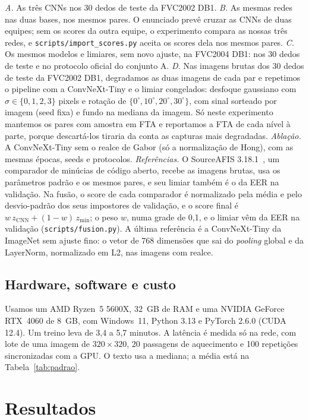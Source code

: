 \documentclass[conference]{IEEEtran}
\newcommand{\TrainMin}{de 3,4 a 5,7}
\begin{document}
\emph{A.} As três CNNs nos 30 dedos de teste da FVC2002 DB1. \emph{B.} As mesmas redes nas duas bases, nos mesmos pares. O enunciado prevê cruzar as CNNs de duas equipes; sem os scores da outra equipe, o experimento compara as nossas três redes, e \texttt{scripts/import\_scores.py} aceita os scores dela nos mesmos pares. \emph{C.} Os mesmos modelos e limiares, sem novo ajuste, na FVC2004 DB1: nos 30 dedos de teste e no protocolo oficial do conjunto A. \emph{D.} Nas imagens brutas dos 30 dedos de teste da FVC2002 DB1, degradamos as duas imagens de cada par e repetimos o pipeline com a ConvNeXt-Tiny e o limiar congelados: desfoque gaussiano com $\sigma\in\{0,1,2,3\}$ pixels e rotação de $\{0^\circ,10^\circ,20^\circ,30^\circ\}$, com sinal sorteado por imagem (seed fixa) e fundo na mediana da imagem. Só neste experimento mantemos os pares com amostra em FTA e reportamos a FTA de cada nível à parte, porque descartá-los tiraria da conta as capturas mais degradadas. \emph{Ablação.} A ConvNeXt-Tiny sem o realce de Gabor (só a normalização de Hong), com as mesmas épocas, seeds e protocolos. \emph{Referências.} O SourceAFIS 3.18.1~\cite{vazan2024sourceafis}, um comparador de minúcias de código aberto, recebe as imagens brutas, usa os parâmetros padrão e os mesmos pares, e seu limiar também é o da EER na validação. Na fusão, o score de cada comparador é normalizado pela média e pelo desvio-padrão dos seus impostores de validação, e o score final é $w\,z_{\text{CNN}}+(1-w)\,z_{\text{min}}$; o peso $w$, numa grade de 0,1, e o limiar vêm da EER na validação (\texttt{scripts/fusion.py}). A última referência é a ConvNeXt-Tiny da ImageNet sem ajuste fino: o vetor de 768 dimensões que sai do \emph{pooling} global e da LayerNorm, normalizado em L2, nas imagens com realce.

\subsection{Hardware, software e custo}

Usamos um AMD Ryzen~5 5600X, 32~GB de RAM e uma NVIDIA GeForce RTX~4060 de 8~GB, com Windows~11, Python 3.13 e PyTorch 2.6.0 (CUDA 12.4). Um treino leva \TrainMin{} minutos. A latência é medida só na rede, com lote de uma imagem de $320\times320$, 20 passagens de aquecimento e 100 repetições sincronizadas com a GPU. O texto usa a mediana; a média está na Tabela~\ref{tab:padrao}.

\section{Resultados}
\label{sec:resultados}
\end{document}
